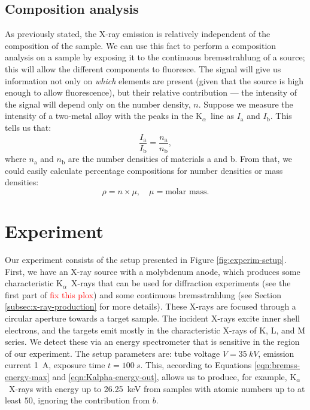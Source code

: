 \documentclass[11pt,a4paper,twoside,onecolumn]{article}
\newcommand{\reminder}[1]{\textcolor{red}{#1}}
\newcommand{\Kalpha}{$\mathrm{K}_\alpha$~}
\begin{document}
\subsection{Composition analysis}\label{subsec:compos-analysis}
As previously stated, the X-ray emission is relatively independent of the composition of the sample. We can use this fact to perform a composition analysis on a sample by exposing it to the continuous bremsstrahlung of a source; this will allow the different components to fluoresce. The signal will give us information not only on \emph{which} elements are present (given that the source is high enough to allow fluorescence), but their relative contribution --- the intensity of the signal will depend only on the number density, $n$. Suppose we measure the intensity of a two-metal alloy with the peaks in the \Kalpha line as $I_\mathrm{a}$ and $I_\mathrm{b}$.
This tells us that:
\begin{equation}
    \frac{I_\mathrm{a}}{I_\mathrm{b}} = \frac{n_\mathrm{a}}{n_\mathrm{b}},
\end{equation}
where $n_\mathrm{a}$ and $n_\mathrm{b}$ are the number densities of materials a and b. From that, we could easily calculate percentage compositions for number densities or mass densities:
\begin{equation}
    \rho = n \times \mu, \quad \mu = \text{molar mass}.
\end{equation}

\section{Experiment}\label{sec:experiment}
Our experiment consists of the setup presented in Figure \ref{fig:experim-setup}. First, we have an X-ray source with a molybdenum anode, which produces some characteristic \Kalpha X-rays that can be used for diffraction experiments (see the first part of \cite{OxfPhys2010} \reminder{fix this plox}) and some continuous bremsstrahlung (see Section \ref{subsec:x-ray-production} for more details). These X-rays are focused through a circular aperture towards a target sample. The incident X-rays excite inner shell electrons, and the targets emit mostly in the characteristic X-rays of K, L, and M series. We detect these via an energy spectrometer that is sensitive in the region of our experiment. The setup parameters are: tube voltage $V = \qty{35}{kV}$, emission current \qty{1}{A}, exposure time $t=\qty{100}{s}$. This, according to Equations \eqref{eqn:bremss-energy-max} and \eqref{eqn:Kalpha-energy-out}, allows us to produce, for example, \Kalpha X-rays with energy up to \qty{26.25}{keV} from samples with atomic numbers up to at least $50$, ignoring the contribution from $b$.
\end{document}

